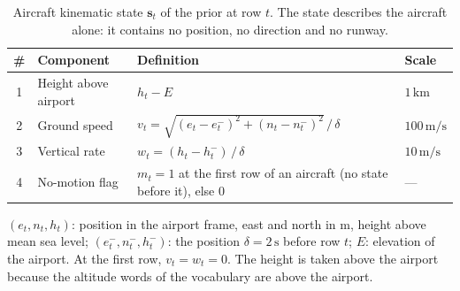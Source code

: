
\begin{table}[t]
\centering
\caption{Aircraft kinematic state $\mathbf{s}_t$ of the prior at row $t$. The state describes the aircraft alone: it
contains no position, no direction and no runway.}
\label{tab:kinematic-state}
\small
\renewcommand{\arraystretch}{1.25}
\begin{tabularx}{\textwidth}{@{}c l >{\raggedright\arraybackslash}X l@{}}
\toprule
\# & Component & Definition & Scale \\
\midrule
1 & Height above airport & $h_t - E$ & $1\,\mathrm{km}$ \\
2 & Ground speed         & $v_t = \sqrt{(e_t-e_t^-)^2+(n_t-n_t^-)^2}\,/\,\delta$ & $100\,\mathrm{m/s}$ \\
3 & Vertical rate        & $w_t = (h_t-h_t^-)\,/\,\delta$ & $10\,\mathrm{m/s}$ \\
4 & No-motion flag       & $m_t = 1$ at the first row of an aircraft (no state before it), else $0$ & --- \\
\bottomrule
\end{tabularx}
\par\smallskip
{\footnotesize $(e_t, n_t, h_t)$: position in the airport frame, east and north in m, height above mean sea level;
$(e_t^-, n_t^-, h_t^-)$: the position $\delta = 2\,\mathrm{s}$ before row $t$; $E$: elevation of the airport.
At the first row, $v_t = w_t = 0$. The height is taken above the airport because the altitude words of the
vocabulary are above the airport.\par}
\end{table}

